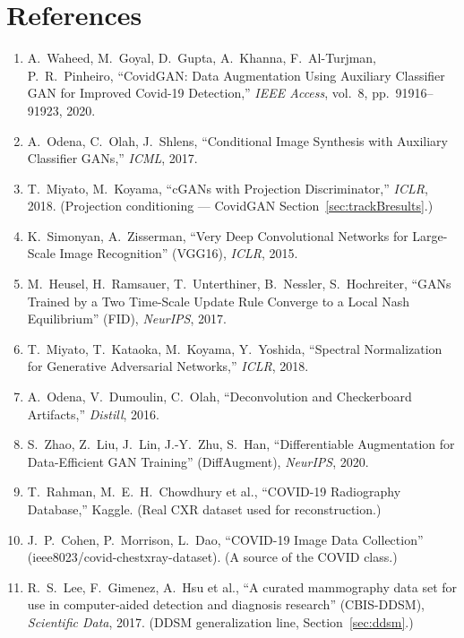 \documentclass[11pt]{article}
\begin{document}
\section{References}
\begin{enumerate}[nosep,leftmargin=1.6em]
  \item A.~Waheed, M.~Goyal, D.~Gupta, A.~Khanna, F.~Al-Turjman, P.~R.~Pinheiro,
        ``CovidGAN: Data Augmentation Using Auxiliary Classifier GAN for Improved
        Covid-19 Detection,'' \emph{IEEE Access}, vol.~8, pp.~91916--91923, 2020.
  \item A.~Odena, C.~Olah, J.~Shlens, ``Conditional Image Synthesis with Auxiliary
        Classifier GANs,'' \emph{ICML}, 2017.
  \item T.~Miyato, M.~Koyama, ``cGANs with Projection Discriminator,'' \emph{ICLR},
        2018. (Projection conditioning --- CovidGAN Section~\ref{sec:trackBresults}.)
  \item K.~Simonyan, A.~Zisserman, ``Very Deep Convolutional Networks for
        Large-Scale Image Recognition'' (VGG16), \emph{ICLR}, 2015.
  \item M.~Heusel, H.~Ramsauer, T.~Unterthiner, B.~Nessler, S.~Hochreiter, ``GANs
        Trained by a Two Time-Scale Update Rule Converge to a Local Nash
        Equilibrium'' (FID), \emph{NeurIPS}, 2017.
  \item T.~Miyato, T.~Kataoka, M.~Koyama, Y.~Yoshida, ``Spectral Normalization for
        Generative Adversarial Networks,'' \emph{ICLR}, 2018.
  \item A.~Odena, V.~Dumoulin, C.~Olah, ``Deconvolution and Checkerboard Artifacts,''
        \emph{Distill}, 2016.
  \item S.~Zhao, Z.~Liu, J.~Lin, J.-Y.~Zhu, S.~Han, ``Differentiable Augmentation for
        Data-Efficient GAN Training'' (DiffAugment), \emph{NeurIPS}, 2020.
  \item T.~Rahman, M.~E.~H.~Chowdhury et al., ``COVID-19 Radiography Database,''
        Kaggle. (Real CXR dataset used for reconstruction.)
  \item J.~P.~Cohen, P.~Morrison, L.~Dao, ``COVID-19 Image Data Collection''
        (ieee8023/covid-chestxray-dataset). (A source of the COVID class.)
  \item R.~S.~Lee, F.~Gimenez, A.~Hsu et al., ``A curated mammography data set for use
        in computer-aided detection and diagnosis research'' (CBIS-DDSM),
        \emph{Scientific Data}, 2017. (DDSM generalization line, Section~\ref{sec:ddsm}.)
\end{enumerate}
\end{document}
